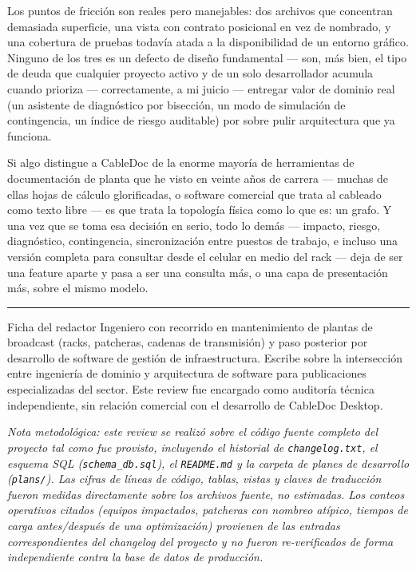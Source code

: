 \documentclass[11pt,twocolumn]{article}
\begin{document}
Los puntos de fricción son reales pero manejables: dos archivos que concentran demasiada superficie, una vista con contrato posicional en vez de nombrado, y una cobertura de pruebas todavía atada a la disponibilidad de un entorno gráfico. Ninguno de los tres es un defecto de diseño fundamental --- son, más bien, el tipo de deuda que cualquier proyecto activo y de un solo desarrollador acumula cuando prioriza --- correctamente, a mi juicio --- entregar valor de dominio real (un asistente de diagnóstico por bisección, un modo de simulación de contingencia, un índice de riesgo auditable) por sobre pulir arquitectura que ya funciona.

Si algo distingue a CableDoc de la enorme mayoría de herramientas de documentación de planta que he visto en veinte años de carrera --- muchas de ellas hojas de cálculo glorificadas, o software comercial que trata al cableado como texto libre --- es que trata la topología física como lo que es: un grafo. Y una vez que se toma esa decisión en serio, todo lo demás --- impacto, riesgo, diagnóstico, contingencia, sincronización entre puestos de trabajo, e incluso una versión completa para consultar desde el celular en medio del rack --- deja de ser una feature aparte y pasa a ser una consulta más, o una capa de presentación más, sobre el mismo modelo.

\vspace{0.6em}
\noindent\textcolor{BDrule}{\rule{\linewidth}{0.6pt}}

\vspace{0.4em}
\begin{specbox}{Ficha del redactor}
Ingeniero con recorrido en mantenimiento de plantas de broadcast (racks, patcheras, cadenas de transmisión) y paso posterior por desarrollo de software de gestión de infraestructura. Escribe sobre la intersección entre ingeniería de dominio y arquitectura de software para publicaciones especializadas del sector. Este review fue encargado como auditoría técnica independiente, sin relación comercial con el desarrollo de CableDoc Desktop.
\end{specbox}

\vspace{0.4em}
{\footnotesize\color{BDgray}
\textit{Nota metodológica: este review se realizó sobre el código fuente completo del proyecto tal como fue provisto, incluyendo el historial de \texttt{changelog.txt}, el esquema SQL (\texttt{schema\_db.sql}), el \texttt{README.md} y la carpeta de planes de desarrollo (\texttt{plans/}). Las cifras de líneas de código, tablas, vistas y claves de traducción fueron medidas directamente sobre los archivos fuente, no estimadas. Los conteos operativos citados (equipos impactados, patcheras con nombreo atípico, tiempos de carga antes/después de una optimización) provienen de las entradas correspondientes del changelog del proyecto y no fueron re-verificados de forma independiente contra la base de datos de producción.}
}
\end{document}
